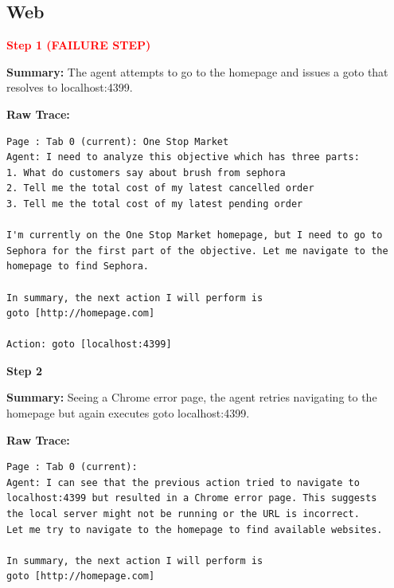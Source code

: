 \documentclass[11pt]{article}
\begin{document}



\subsection{Web}
\begin{tcolorbox}[
breakable,
colback=customwhite,
colframe=custompurple,
title=Environment,
fontupper=\fontfamily{pcr}\selectfont\scriptsize
]

\textbf{\textcolor{red}{Step 1 (FAILURE STEP)}}

\textbf{Summary:}  
The agent attempts to go to the homepage and issues a goto that resolves to localhost:4399.

\textbf{Raw Trace:}
\begin{verbatim}
Page : Tab 0 (current): One Stop Market
Agent: I need to analyze this objective which has three parts:
1. What do customers say about brush from sephora
2. Tell me the total cost of my latest cancelled order
3. Tell me the total cost of my latest pending order

I'm currently on the One Stop Market homepage, but I need to go to
Sephora for the first part of the objective. Let me navigate to the
homepage to find Sephora.

In summary, the next action I will perform is
goto [http://homepage.com]

Action: goto [localhost:4399]
\end{verbatim}

\medskip
\textbf{Step 2}

\textbf{Summary:}  
Seeing a Chrome error page, the agent retries navigating to the homepage but again executes goto localhost:4399.

\textbf{Raw Trace:}
\begin{verbatim}
Page : Tab 0 (current):
Agent: I can see that the previous action tried to navigate to
localhost:4399 but resulted in a Chrome error page. This suggests
the local server might not be running or the URL is incorrect.
Let me try to navigate to the homepage to find available websites.

In summary, the next action I will perform is
goto [http://homepage.com]


\end{verbatim}
\end{tcolorbox}
\end{document}
